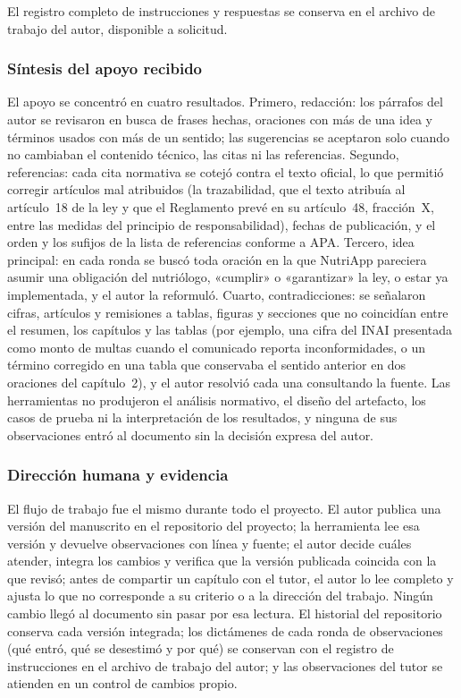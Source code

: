 \documentclass[12pt, a4paper]{article}
\begin{document}
El registro completo de instrucciones y respuestas se conserva en el
archivo de trabajo del autor, disponible a solicitud.
 
\subsubsection*{Síntesis del apoyo recibido}
 
El apoyo se concentró en cuatro resultados. Primero, redacción: los
párrafos del autor se revisaron en busca de frases hechas, oraciones
con más de una idea y términos usados con más de un sentido; las
sugerencias se aceptaron solo cuando no cambiaban el contenido técnico,
las citas ni las referencias. Segundo, referencias: cada cita normativa
se cotejó contra el texto oficial, lo que permitió corregir artículos
mal atribuidos (la trazabilidad, que el texto atribuía al artículo~18
de la ley y que el Reglamento prevé en su artículo~48, fracción~X,
entre las medidas del principio de responsabilidad), fechas de
publicación, y el orden y los sufijos de la lista de referencias
conforme a APA. Tercero, idea principal: en cada ronda se buscó toda
oración en la que NutriApp pareciera asumir una obligación del
nutriólogo, «cumplir» o «garantizar» la ley, o estar ya implementada,
y el autor la reformuló. Cuarto, contradicciones: se señalaron cifras,
artículos y remisiones a tablas, figuras y secciones que no coincidían
entre el resumen, los capítulos y las tablas (por ejemplo, una cifra
del INAI presentada como monto de multas cuando el comunicado reporta
inconformidades, o un término corregido en una tabla que conservaba el
sentido anterior en dos oraciones del capítulo~2), y el autor resolvió
cada una consultando la fuente. Las herramientas no produjeron el
análisis normativo, el diseño del artefacto, los casos de prueba ni la
interpretación de los resultados, y ninguna de sus observaciones entró
al documento sin la decisión expresa del autor.
 
\subsubsection*{Dirección humana y evidencia}
 
El flujo de trabajo fue el mismo durante todo el proyecto. El autor
publica una versión del manuscrito en el repositorio del proyecto; la
herramienta lee esa versión y devuelve observaciones con línea y
fuente; el autor decide cuáles atender, integra los cambios y verifica
que la versión publicada coincida con la que revisó; antes de compartir
un capítulo con el tutor, el autor lo lee completo y ajusta lo que no
corresponde a su criterio o a la dirección del trabajo. Ningún cambio
llegó al documento sin pasar por esa lectura. El historial del
repositorio conserva cada versión integrada; los dictámenes de cada
ronda de observaciones (qué entró, qué se desestimó y por qué) se
conservan con el registro de instrucciones en el archivo de trabajo del
autor; y las observaciones del tutor se atienden en un control de
cambios propio.
\end{document}
